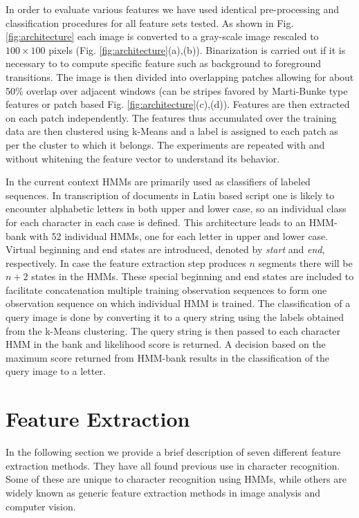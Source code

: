\documentclass[runningheads]{llncs}
\begin{document}
In order to evaluate various features we have used identical pre-processing and classification procedures for all feature sets tested. As shown in Fig. {\ref{fig:architecture}} each image is converted to a gray-scale image rescaled to $100 \times 100$ pixels (Fig. {\ref{fig:architecture}}(a),(b)). Binarization is carried out if it is necessary to to compute specific feature such as background to foreground transitions. The image is then divided into overlapping patches allowing for about 50\% overlap over adjacent windows (can be stripes favored by Marti-Bunke type features or patch based Fig. {\ref{fig:architecture}}(c),(d)). Features are then extracted on each patch independently. The features thus accumulated over the training data are then clustered using k-Means and a label is assigned to each patch as per the cluster to which it belongs. The experiments are repeated with and without whitening the feature vector to understand its behavior.

In the current context HMMs are primarily used as classifiers of labeled sequences. In transcription of documents in Latin based script one is likely to encounter alphabetic letters in both upper and lower case, so an individual class for each character in each case is defined. This architecture leads to an HMM-bank with 52 individual HMMs, one for each letter in upper and lower case. Virtual beginning and end states are introduced, denoted by \textit{start} and \textit{end}, respectively. In case the feature extraction step produces $n$ segments there will be $n + 2$ states in the HMMs. These special beginning and end states are included to facilitate concatenation multiple training observation sequences to form one observation sequence on which individual HMM is trained. The classification of a query image is done by converting it to a query string using the labels obtained from the k-Means clustering. The query string is then passed to each character HMM in the bank and likelihood score is returned. A decision based on the maximum score returned from HMM-bank results in the classification of the query image to a letter.\\

\section{Feature Extraction}
\label{sec:feat}
In the following section we provide a brief description of seven different feature extraction methods. They have all found previous use in character recognition. Some of these are unique to character recognition using HMMs, while others are widely known as generic feature extraction methods in image analysis and computer vision.
\end{document}
